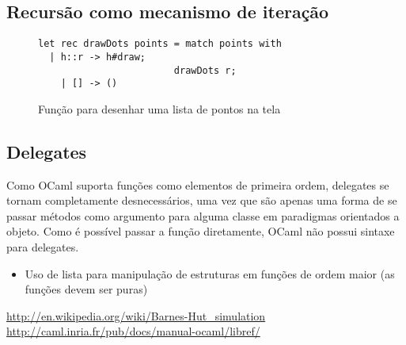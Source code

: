 \documentclass[a4paper,10pt]{article}
\begin{document}
\subsection{Recursão como mecanismo de iteração}

\begin{figure}[H]
	\centering	
	\begin{lstlisting}
let rec drawDots points = match points with
  | h::r -> h#draw;
						drawDots r;
	| [] -> ()
	\end{lstlisting}
	\caption{Função para desenhar uma lista de pontos na tela}
\end{figure}
	
\subsection{Delegates}
	
	Como OCaml suporta funções como elementos de primeira ordem, delegates se tornam completamente desnecessários, uma vez que são apenas uma forma de se passar métodos como argumento para alguma classe em paradigmas orientados a objeto. Como é possível passar a função diretamente, OCaml não possui sintaxe para delegates.
	
\begin{itemize}  
 \item Uso de lista para manipulação de estruturas em funções de ordem maior (as funções devem ser puras) 

\end{itemize}

\begin{thebibliography}{4}
 \url{http://en.wikipedia.org/wiki/Barnes-Hut\_simulation}
 \url{http://caml.inria.fr/pub/docs/manual-ocaml/libref/}
 
\end{thebibliography}
\end{document}
